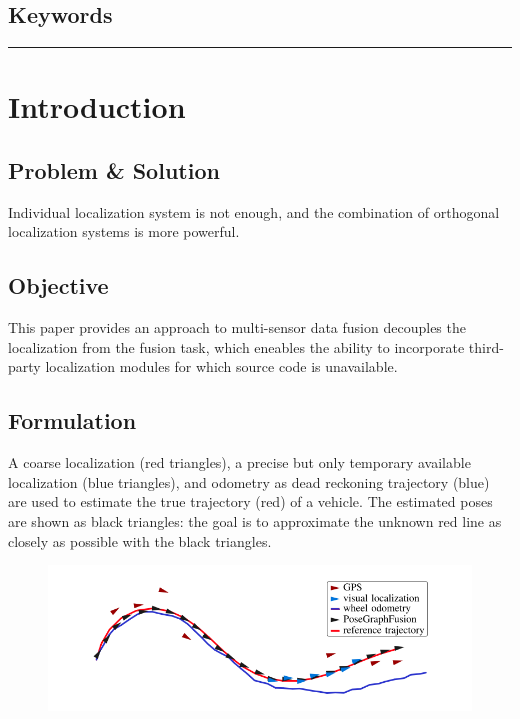 \documentclass[letterpaper,11pt]{article}
\begin{document}
\subsection{Keywords}

\begin{center}\rule{\textwidth}{1pt}\end{center}
\section{Introduction}

\subsection{Problem \& Solution}

Individual localization system is not enough, and the combination of orthogonal localization systems is more powerful.

\subsection{Objective}

This paper provides an approach to multi-sensor data fusion decouples the localization from the fusion task, which eneables the ability to incorporate third-party localization modules for which source code is unavailable.

\subsection{Formulation}

A coarse localization (red triangles), a precise but only temporary available localization (blue triangles), and odometry as dead reckoning trajectory (blue) are used to estimate the true trajectory (red) of a vehicle. The estimated poses are shown as black triangles: the goal is to approximate the unknown red line as closely as possible with the black triangles.

\begin{figure}[!ht]
	\centering
	\includegraphics[width=15cm]{./img/posefusion.png}
\end{figure}
\end{document}
